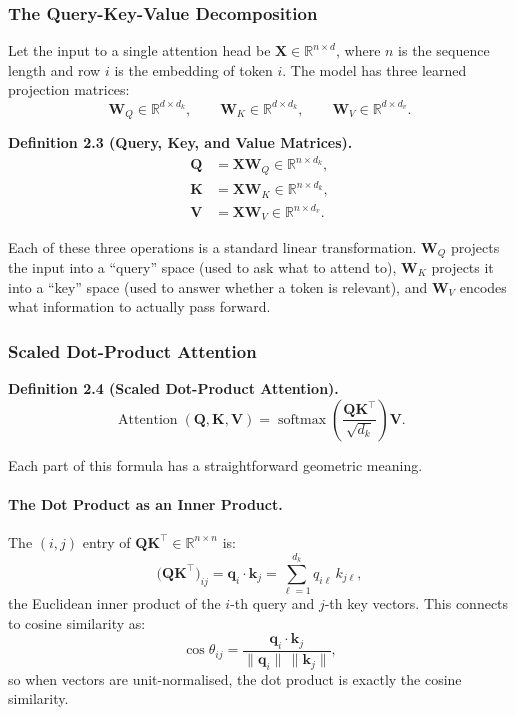 \documentclass[12pt,a4paper]{article}
\begin{document}
\subsubsection{The Query-Key-Value Decomposition}

Let the input to a single attention head be $\mathbf{X} \in \mathbb{R}^{n \times d}$,
where $n$ is the sequence length and row $i$ is the embedding of token $i$. The model
has three learned projection matrices:
\begin{equation}
    \mathbf{W}_Q \in \mathbb{R}^{d \times d_k}, \qquad
    \mathbf{W}_K \in \mathbb{R}^{d \times d_k}, \qquad
    \mathbf{W}_V \in \mathbb{R}^{d \times d_v}.
\end{equation}

\textbf{Definition 2.3 (Query, Key, and Value Matrices).}
\begin{align}
    \mathbf{Q} &= \mathbf{X}\mathbf{W}_Q \in \mathbb{R}^{n \times d_k}, \\
    \mathbf{K} &= \mathbf{X}\mathbf{W}_K \in \mathbb{R}^{n \times d_k}, \\
    \mathbf{V} &= \mathbf{X}\mathbf{W}_V \in \mathbb{R}^{n \times d_v}.
\end{align}

Each of these three operations is a standard linear transformation. $\mathbf{W}_Q$ projects
the input into a ``query'' space (used to ask what to attend to), $\mathbf{W}_K$ projects it
into a ``key'' space (used to answer whether a token is relevant), and $\mathbf{W}_V$ encodes
what information to actually pass forward.

\subsubsection{Scaled Dot-Product Attention}

\textbf{Definition 2.4 (Scaled Dot-Product Attention).}
\begin{equation}
    \operatorname{Attention}(\mathbf{Q}, \mathbf{K}, \mathbf{V})
    = \operatorname{softmax}\!\left(\frac{\mathbf{Q}\mathbf{K}^\top}{\sqrt{d_k}}\right)\mathbf{V}.
\end{equation}

Each part of this formula has a straightforward geometric meaning.

\paragraph{The Dot Product as an Inner Product.}
The $(i,j)$ entry of $\mathbf{Q}\mathbf{K}^\top \in \mathbb{R}^{n \times n}$ is:
\begin{equation}
    \bigl(\mathbf{Q}\mathbf{K}^\top\bigr)_{ij}
    = \mathbf{q}_i \cdot \mathbf{k}_j
    = \sum_{\ell=1}^{d_k} q_{i\ell}\, k_{j\ell},
\end{equation}
the Euclidean inner product of the $i$-th query and $j$-th key vectors. This connects to
cosine similarity as:
\begin{equation}
    \cos\theta_{ij}
    = \frac{\mathbf{q}_i \cdot \mathbf{k}_j}{\|\mathbf{q}_i\|\,\|\mathbf{k}_j\|},
\end{equation}
so when vectors are unit-normalised, the dot product is exactly the cosine similarity.
\end{document}
